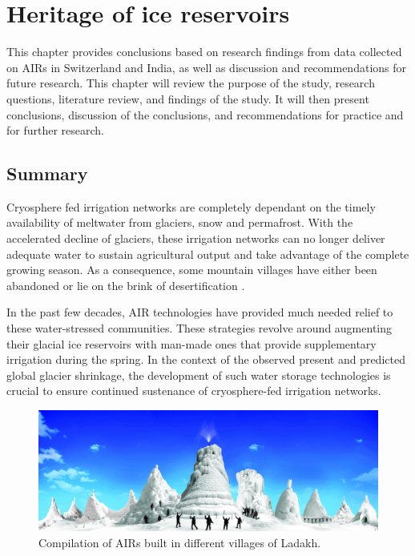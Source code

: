 \chapter{Heritage of ice reservoirs}


This chapter provides conclusions based on research findings from data collected on AIRs in Switzerland and India,
as well as discussion and recommendations for future research. This chapter will review the purpose of the
study, research questions, literature review, and findings of the study. It will then present conclusions,
discussion of the conclusions, and recommendations for practice and for further research.

\section{Summary}

Cryosphere fed irrigation networks are completely dependant on the timely availability of meltwater from
glaciers, snow and permafrost. With the accelerated decline of glaciers, these irrigation networks can no longer
deliver adequate water to sustain agricultural output and take advantage of the complete growing season. As a
consequence, some mountain villages have either been abandoned or lie on the brink of desertification
\citep{grossmanHimalayanGlaciersMelt2015}.

In the past few decades, AIR technologies have provided much needed relief to these
water-stressed communities. These strategies revolve around augmenting their glacial ice reservoirs with
man-made ones that provide supplementary irrigation during the spring. In the context of the observed present
and predicted global glacier shrinkage, the development of such water storage technologies is crucial to ensure
continued sustenance of cryosphere-fed irrigation networks.

\begin{figure}[htb]
	\includegraphics[width=\textwidth]{figs/AIRs_Ladakh}
	\caption{Compilation of AIRs built in different villages of Ladakh.}
	\label{fig:airs_ladakh}
\end{figure}

